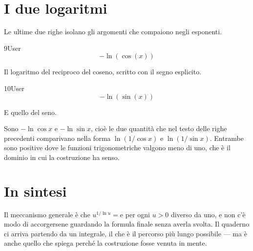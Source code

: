 \section{I due logaritmi}

Le ultime due righe isolano gli argomenti che compaiono negli esponenti.

\begin{espr}{9}{User}{}
\[
-\ln\!\left(\cos\!\left(x\right)\right)
\]
\end{espr}
Il logaritmo del reciproco del coseno, scritto con il segno esplicito.

\begin{espr}{10}{User}{}
\[
-\ln\!\left(\sin\!\left(x\right)\right)
\]
\end{espr}
E quello del seno.


Sono $-\ln\cos x$ e $-\ln\sin x$, cioè le due quantità che nel testo delle righe precedenti comparivano nella forma $\ln(1/\cos x)$ e $\ln(1/\sin x)$. Entrambe sono positive dove le funzioni trigonometriche valgono meno di uno, che è il dominio in cui la costruzione ha senso.

\section*{In sintesi}

Il meccanismo generale è che $u^{1/\ln u}=\mathrm{e}$ per ogni $u>0$ diverso da uno, e non c'è modo di accorgersene guardando la formula finale senza averla svolta. Il quaderno ci arriva partendo da un integrale, il che è il percorso più lungo possibile — ma è anche quello che spiega perché la costruzione fosse venuta in mente.

